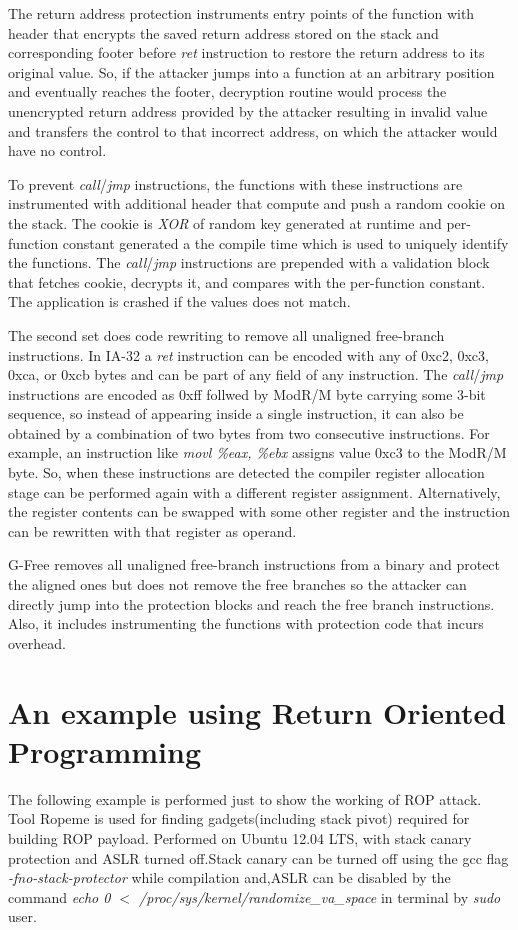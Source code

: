\documentclass{article}
\begin{document}
\begin{multicols}{2}
	The return address protection instruments entry points of the function with header that encrypts
the saved return address stored on the stack and corresponding footer before \textit{ret} instruction to restore the return address to its original value. So, if the attacker jumps into a function at an arbitrary position and eventually reaches the footer, decryption routine would process the unencrypted return address provided by the attacker resulting in invalid value and transfers the control to that incorrect address, on which the attacker would have no control.

	To prevent \textit{call}/\textit{jmp} instructions, the functions with these instructions are instrumented with additional header that compute and push a random cookie on the stack. The cookie is \textit{XOR} of random key generated at runtime and per-function constant generated a the compile time which is used to uniquely identify the functions. The \textit{call}/\textit{jmp} instructions are prepended with a validation block that fetches cookie, decrypts it, and compares with the per-function constant. The application is crashed if the values does not match.
	
	The second set does code rewriting to remove all unaligned free-branch instructions. In IA-32 a \textit{ret} instruction can be encoded with any of 0xc2, 0xc3, 0xca, or 0xcb bytes and can be part of any field of any instruction. The \textit{call}/\textit{jmp} instructions are encoded as 0xff follwed by ModR/M byte carrying some 3-bit sequence, so instead of appearing inside a single instruction, it can also be obtained by a combination of two bytes from two consecutive instructions. For example, an instruction like \textit{movl \%eax, \%ebx} assigns value 0xc3 to the ModR/M byte. So, when these instructions are detected the compiler register allocation stage can be performed again with a different register assignment. Alternatively, the register contents can be swapped with some other register and the instruction can be rewritten with that register as operand.
	
	G-Free removes all unaligned free-branch instructions from a binary and protect the aligned ones but does not remove the free branches so the attacker can directly jump into the protection blocks and reach the free branch instructions. Also, it includes instrumenting the functions with protection code that incurs overhead.

	\section{An example using Return Oriented Programming}
	The following example is performed just to show the working of ROP attack. Tool Ropeme\cite{ropeme} is used for finding gadgets(including stack pivot) required for building ROP payload. Performed on Ubuntu 12.04 LTS, with stack canary protection and ASLR turned off.\break Stack canary can be turned off using the gcc flag \textit{-fno-stack-protector} while compilation and,\break ASLR can be disabled by the command \textit{echo 0 $<$ /proc/sys/kernel/randomize\_va\_space} in terminal by \textit{sudo} user. 
	

\end{multicols}
\end{document}
